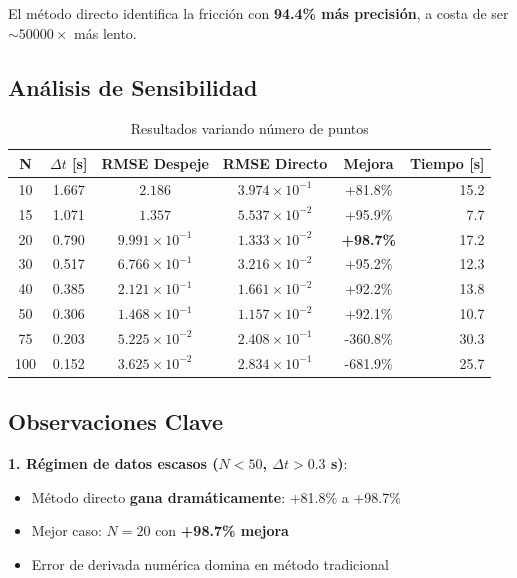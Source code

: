 \documentclass[11pt,a4paper]{article}
\begin{document}
El método directo identifica la fricción con \textbf{94.4\% más precisión}, a costa de ser $\sim 50000\times$ más lento.

\subsection{Análisis de Sensibilidad}

\begin{table}[H]
\centering
\caption{Resultados variando número de puntos}
\small
\begin{tabular}{cccccr}
\toprule
\textbf{N} & \textbf{$\Delta t$ [s]} & \textbf{RMSE Despeje} & \textbf{RMSE Directo} & \textbf{Mejora} & \textbf{Tiempo [s]} \\
\midrule
10 & 1.667 & $2.186$ & $3.974 \times 10^{-1}$ & \cellcolor{green!30} +81.8\% & 15.2 \\
15 & 1.071 & $1.357$ & $5.537 \times 10^{-2}$ & \cellcolor{green!40} +95.9\% & 7.7 \\
\rowcolor{green!50}
20 & 0.790 & $9.991 \times 10^{-1}$ & $1.333 \times 10^{-2}$ & \textbf{+98.7\%} & 17.2 \\
30 & 0.517 & $6.766 \times 10^{-1}$ & $3.216 \times 10^{-2}$ & \cellcolor{green!40} +95.2\% & 12.3 \\
40 & 0.385 & $2.121 \times 10^{-1}$ & $1.661 \times 10^{-2}$ & \cellcolor{green!30} +92.2\% & 13.8 \\
50 & 0.306 & $1.468 \times 10^{-1}$ & $1.157 \times 10^{-2}$ & \cellcolor{green!30} +92.1\% & 10.7 \\
\midrule
\rowcolor{red!20}
75 & 0.203 & $5.225 \times 10^{-2}$ & $2.408 \times 10^{-1}$ & -360.8\% & 30.3 \\
\rowcolor{red!30}
100 & 0.152 & $3.625 \times 10^{-2}$ & $2.834 \times 10^{-1}$ & -681.9\% & 25.7 \\
\bottomrule
\end{tabular}
\end{table}

\subsection{Observaciones Clave}

\textbf{1. Régimen de datos escasos ($N < 50$, $\Delta t > 0.3$ s)}:
\begin{itemize}
\item Método directo \textbf{gana dramáticamente}: +81.8\% a +98.7\%
\item Mejor caso: $N = 20$ con \textbf{+98.7\% mejora}
\item Error de derivada numérica domina en método tradicional
\end{itemize}
\end{document}
